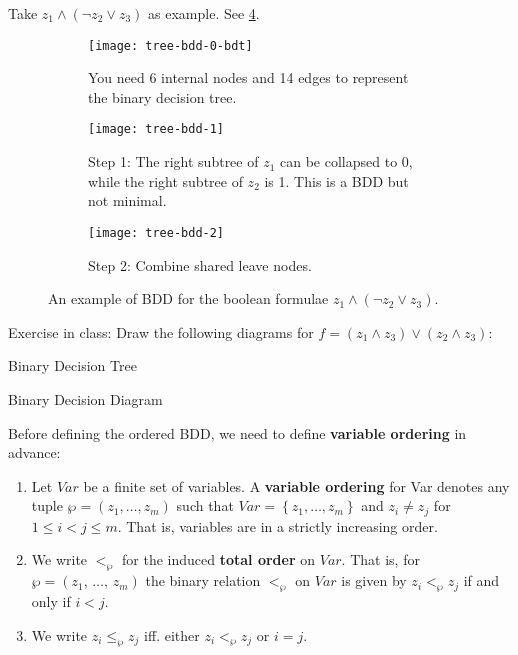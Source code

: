 \documentclass[../src/handouts/main.tex]{subfiles}
\begin{document}
Take $z_1 \land \left( \neg z_2 \lor z_3 \right)$ as example. See \cref{fig:tree-bdd}.

\begin{figure}[htbp]
  \centering
  \begin{subfigure}[t]{.6\textwidth}
    \centering
    \texttt{[image: tree-bdd-0-bdt]}
    \caption{You need 6 internal nodes and 14 edges to represent the binary decision tree.}
    \label{fig:tree-bdd-0-bdt}
  \end{subfigure}

  \begin{subfigure}[t]{.4\textwidth}
    \centering
    \texttt{[image: tree-bdd-1]}
    \caption{Step 1: The right subtree of $z_1$ can be collapsed to 0, while the right subtree of $z_2$ is 1. This is a BDD but not minimal.}
    \label{fig:tree-bdd-1}
  \end{subfigure}
  \hfill
  \begin{subfigure}[t]{.4\textwidth}
    \centering
    \texttt{[image: tree-bdd-2]}
    \caption{Step 2: Combine shared leave nodes.}
    \label{fig:tree-bdd-2}
  \end{subfigure}

  \caption{An example of BDD for the boolean formulae $z_1 \land \left( \neg z_2 \lor z_3 \right)$.}
  \label{fig:tree-bdd}
\end{figure}

Exercise in class: Draw the following diagrams for $f=\left(z_1 \land z_3\right) \lor \left(z_2 \land z_3\right)$:
\begin{enumerate*}
  \item Binary Decision Tree
  \item Binary Decision Diagram
\end{enumerate*}



Before defining the ordered BDD, we need to define \textbf{variable ordering} in advance:
\begin{enumerate}
  \item Let $Var$ be a finite set of variables. A \textbf{variable ordering} for Var denotes any tuple $\wp = \left(z_1, \ldots, z_m\right)$ such that $Var = \left\{z_1, \ldots, z_m \right\}$ and $z_i \neq z_j$ for $1 \leq i < j \leq m$. That is, variables are in a strictly increasing order.

  \item We write $<_{\wp}$ for the induced \textbf{total order} on $Var$. That is, for $\wp = \left( z_1,\, \ldots,\, z_m \right)$ the binary relation $<_{\wp}$ on $Var$ is given by $z_i <_{\wp} z_j$ if and only if $i < j$.

  \item We write $z_i \leqslant_{\wp} z_j$ iff. either $z_i <_{\wp} z_j$ or $i = j$.
\end{enumerate}
\end{document}
